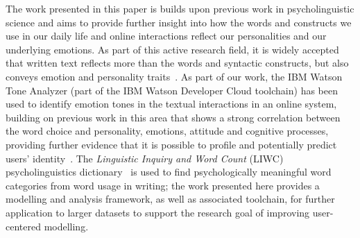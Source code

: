 \documentclass[graybox]{svmult}
\begin{document}
The work presented in this paper is builds upon previous work in
psycholinguistic science and aims to provide further insight into how
the words and constructs we use in our daily life and online
interactions reflect our personalities and our underlying emotions. As
part of this active research field, it is widely accepted that written
text reflects more than the words and syntactic constructs, but also
conveys emotion and personality
traits~\citep{pennebaker+king:1999}. As part of our work, the IBM
Watson Tone Analyzer (part of the IBM Watson Developer Cloud
toolchain) has been used to identify emotion tones in the textual
interactions in an online system, building on previous work in this
area that shows a strong correlation between the word choice and
personality, emotions, attitude and cognitive processes, providing
further evidence that it is possible to profile and potentially
predict users’ identity~\citep{fast+funder:2008}. The
{\emph{Linguistic Inquiry and Word Count}} (LIWC) psycholinguistics
dictionary~\citep{tausczik+pennebaker:2010} is
used to find psychologically meaningful word categories from word
usage in writing; the work presented here provides a modelling and
analysis framework, as well as associated toolchain, for further
application to larger datasets to support the research goal of
improving user-centered modelling.




\end{document}
